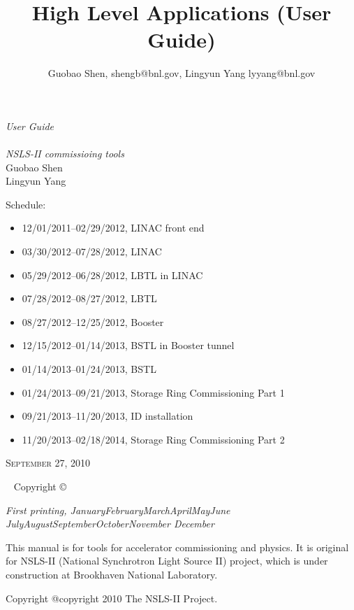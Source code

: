 \documentclass[11pt,oneside,letterpaper,showtrims,article]{memoir}
\title{High Level Applications (User Guide)}
\author{Guobao Shen, shengb@bnl.gov, Lingyun Yang lyyang@bnl.gov}
\newcommand{\monthyear}{%
  \ifcase\month\or January\or February\or March\or April\or May\or June\or
  July\or August\or September\or October\or November\or
  December\fi\space\number\year
}
\begin{document}
\begin{titlingpage}
{\begingroup%
\raggedleft
\vspace*{\baselineskip}
{\Huge\itshape User Guide} \\
\vspace*{\baselineskip}{\Huge\itshape of High Level Applications}\\[\baselineskip]
{\large\itshape NSLS-II commissioing tools}\\[0.2\textheight]
{\Large Guobao Shen\\Lingyun Yang}\par
\vfill
\flushleft
{\sffamily
  Schedule:\hfill
\begin{itemize}
\item 12/01/2011--02/29/2012, LINAC front end
\item 03/30/2012--07/28/2012, LINAC
\item 05/29/2012--06/28/2012, LBTL in LINAC
\item 07/28/2012--08/27/2012, LBTL
\item 08/27/2012--12/25/2012, Booster
\item 12/15/2012--01/14/2013, BSTL in Booster tunnel
\item 01/14/2013--01/24/2013, BSTL
\item 01/24/2013--09/21/2013, Storage Ring Commissioning Part 1
\item 09/21/2013--11/20/2013, ID installation
\item 11/20/2013--02/18/2014, Storage Ring Commissioning Part 2
\end{itemize}
}
\vspace*{5ex}
{\small\scshape September 27, 2010}
\vspace*{\baselineskip}
\endgroup}
\end{titlingpage}


\newpage
~\vfill
\thispagestyle{empty}
\setlength{\parindent}{0pt}
\setlength{\parskip}{\baselineskip}
Copyright \copyright\ %

\par\textit{First printing, \monthyear}

This manual is for tools for accelerator commissioning and physics. It
is original for NSLS-II (National Synchrotron Light Source II)
project, which is under construction at Brookhaven National
Laboratory. 

Copyright @copyright{} 2010 The NSLS-II Project.
\end{document}
